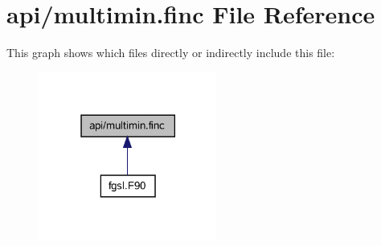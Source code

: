 \hypertarget{multimin_8finc}{}\section{api/multimin.finc File Reference}
\label{multimin_8finc}
This graph shows which files directly or indirectly include this file\+:\nopagebreak
\begin{figure}[H]
\begin{center}
\leavevmode
\includegraphics[width=166pt]{multimin_8finc__dep__incl}
\end{center}
\end{figure}
